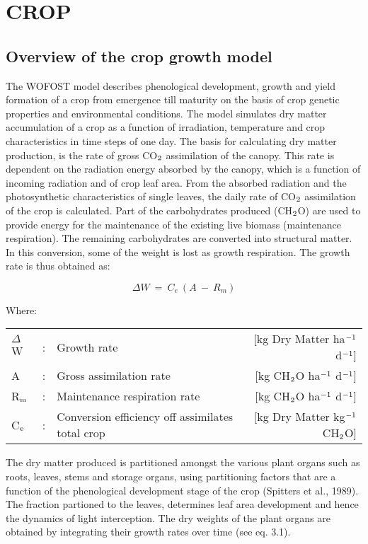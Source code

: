 \chapter{CROP}

\section{Overview of the crop growth model}

The WOFOST model describes phenological development, growth and yield forma\-tion of
a crop from emergence till maturity on the basis of crop genetic properties and environ\-mental conditions. The model simulates dry matter accumulation of a crop as a function
of irradiation, temperature and crop characteristics in time steps of one day. 
The basis for calculating dry matter production, is the rate of gross CO$_{{\rm 2}}$ assimilation of
the canopy. This rate is dependent on the radiation energy absorbed by the canopy, which
is a function of incoming radiation and of crop leaf area. From the absorbed radiation and
the photosynthetic characteristics of single leaves, the daily rate of CO$_{{\rm 2}}$ assimilation of the
crop is calculated. Part of the carbohydrates produced (CH$_{{\rm 2}}$O) are used to provide energy
for the maintenance of the existing live biomass (maintenance respiration). The remaining
carbohydrates are converted into structural matter. In this conversion, some of the weight
is lost as growth respir\-ation. The growth rate is thus obtained as:

\begin{equation}
\Delta W ~=~ C _{e} ~( A ~-~ R _{m} )
\end{equation}

 
Where:\\
\begin{tabularx}{\textwidth}{llXr}
$\Delta$W &:& Growth rate    &   [kg Dry Matter ha$^{{\rm -1}}$ d$^{{\rm -1}}$]\\
A  &:& Gross assimilation   rate &  [kg CH$_{{\rm 2}}$O ha$^{{\rm -1}}$ d$^{{\rm -1}}$]\\
R$_{{\rm m}}$  &:& Maintenance respiration rate    &  [kg CH$_{{\rm 2}}$O ha$^{{\rm -1}}$ d$^{{\rm -1}}$]\\
C$_{{\rm e}}$ &:& Conversion efficiency off assimilates total crop   &   [kg Dry Matter kg$^{{\rm -1}}$ CH$_{{\rm 2}}$O]\\
\end{tabularx}

The dry matter produced is partitioned amongst the various plant organs such as roots,
leaves, stems and storage organs, using partitioning factors that are a function of the
phenological development stage of the crop (Spitters et al., 1989). The fraction partioned
to the leaves, determines leaf area development and hence the dynamics of light intercep\-tion. 
The dry weights of the plant organs are obtained by integrating their growth rates
over time (see eq. 3.1).

